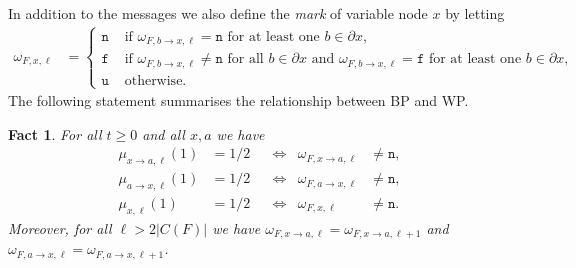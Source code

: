 \documentclass[10pt,reqno]{amsart}
\numberwithin{equation}{section}
\newcommand{\frozen}{\mathtt{f}}
\newcommand{\unfrozen}{\mathtt{u}}
\newcommand{\nll}{\mathtt{n}}
\newcommand{\fzn}{\frozen}
\newcommand{\uzn}{\unfrozen}
\newtheorem{fact}[definition]{Fact}
\begin{document}
In addition to the messages we also define the {\em mark} of variable node $x$ by letting
\begin{align}\label{eqmarks}
	\omega_{F,x,\ell}&=\begin{cases}
		\nll&\mbox{ if }\omega_{F,b\to x,\ell}=\nll\mbox{ for at least one }b\in\partial x,\\
		\fzn&\mbox{ if }\omega_{F,b\to x,\ell}\neq\nll\mbox{ for all }b\in\partial x
		\mbox{ and }\omega_{F,b\to x,\ell}=\fzn\mbox{ for at least one }b\in\partial x,\\
		\uzn&\mbox{ otherwise}.
		\end{cases}
\end{align}
The following statement summarises the relationship between BP and WP.

\begin{fact}\label{fact_wp}
	For all $t\geq0$ and all $x,a$ we have
\begin{align}\label{eqfact_wp1}
		\mu_{x\to a,\ell}(1)&=1/2&&\Leftrightarrow&\omega_{F,x\to a,\ell}&\neq\nll,\\
		\mu_{a\to x,\ell}(1)&=1/2&&\Leftrightarrow&\omega_{F,a\to x,\ell}&\neq\nll,\label{eqfact_wp2}\\
		\mu_{x,\ell}(1)&=1/2&&\Leftrightarrow&\omega_{F,x,\ell}&\neq\nll.\label{eqfact_wp3}
		\end{align}
	Moreover, for all $\ell>2|C(F)|$ we have $\omega_{F,x\to a,\ell}=\omega_{F,x\to a,\ell+1}$ and $\omega_{F,a\to x,\ell}=\omega_{F,a\to x,\ell+1}$.
\end{fact}
\end{document}
